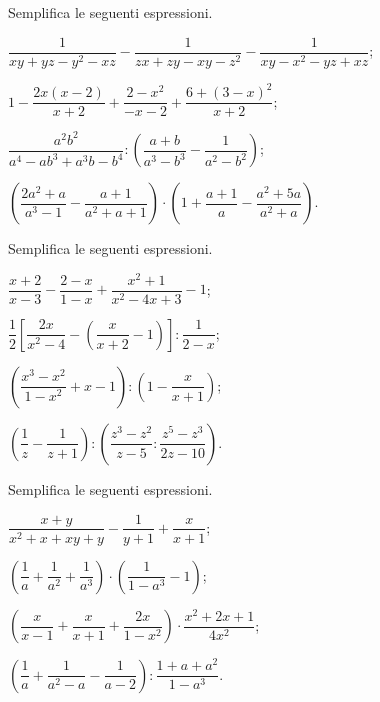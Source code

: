 \begin{esercizio}[\Ast]
\label{ese:14.39}
Semplifica le seguenti espressioni.
\begin{enumeratea}
 \item $\dfrac{1}{xy+yz-y^{2}-xz}-\dfrac{1}{zx+zy-xy-z^{2}}-\dfrac{1}{xy-x^{2}-yz+xz}$;
 \item $1-\dfrac{2x(x-2)}{x+2}+\dfrac{2-x^{2}}{-x-2}+\dfrac{6+(3-x)^{2}}{x+2}$;
 \item $\dfrac{a^{2}b^{2}}{a^{4}-ab^{3}+a^{3}b-b^{4}}:\left(\dfrac{a+b}{a^{3}-b^{3}}-\dfrac{1}{a^{2}-b^{2}}\right)$;
 \item $\left(\dfrac{2a^{2}+a}{a^{3}-1}-\dfrac{a+1}{a^{2}+a+1}\right)\cdot \left(1+\dfrac{a+1}{a}-\dfrac{a^{2}+5a}{a^{2}+a}\right)$.
\end{enumeratea}
\end{esercizio}

\begin{esercizio}[\Ast]
\label{ese:14.40}
Semplifica le seguenti espressioni.
\begin{multicols}{2}
\begin{enumeratea}
 \item $\dfrac{x+2}{x-3}-\dfrac{2-x}{1-x}+\dfrac{x^{2}+1}{x^{2}-4x+3}-1$;
 \item $\dfrac{1}{2}\left[\dfrac{2x}{x^{2}-4}-\left(\dfrac{x}{x+2}-1\right)\right]:\dfrac{1}{2-x}$;
 \item $\left(\dfrac{x^{3}-x^{2}}{1-x^{2}}+x-1\right):\left(1-\dfrac{x}{x+1}\right)$;
 \item $\left(\dfrac{1}{z}-\dfrac{1}{z+1}\right):\left(\dfrac{z^{3}-z^{2}}{z-5}:\dfrac{z^{5}-z^{3}}{2z-10}\right)$.
\end{enumeratea}
\end{multicols}
\end{esercizio}

\begin{esercizio}[\Ast]
\label{ese:14.41}
Semplifica le seguenti espressioni.
\begin{multicols}{2}
\begin{enumeratea}
 \item $\dfrac{x+y}{x^{2}+x+xy+y}-\dfrac{1}{y+1}+\dfrac{x}{x+1}$;
 \item $\left(\dfrac{1}{a}+\dfrac{1}{a^{2}}+\dfrac{1}{a^{3}}\right)\cdot \left(\dfrac{1}{1-a^{3}}-1\right)$;
 \item $\left(\dfrac{x}{x-1}+\dfrac{x}{x+1}+\dfrac{2x}{1-x^{2}}\right)\cdot {\dfrac{x^{2}+2x+1}{4x^{2}}}$;
 \item $\left(\dfrac{1}{a}+\dfrac{1}{a^{{2}}-a}-\dfrac{1}{a-2}\right):\dfrac{1+a+a^{2}}{1-a^{3}}$.
\end{enumeratea}
\end{multicols}
\end{esercizio}

